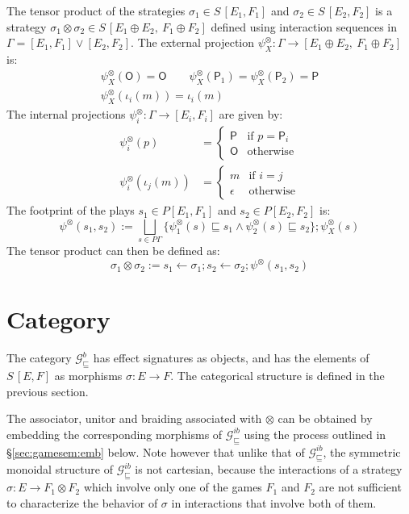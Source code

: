 \documentclass[11pt,oneside,draft]{book}
\theoremstyle{definition}
\newcommand{\gcat}{\mathcal{G}_{\sqsubseteq}}
\newcommand{\kw}[1]{\ensuremath{ \mathsf{#1} }}
\begin{document}
The tensor product of the strategies
$\sigma_1 \in S\,[E_1,F_1]$ and
$\sigma_2 \in S\,[E_2,F_2]$
is a strategy
$\sigma_1 \otimes \sigma_2 \in S\,[E_1 \oplus E_2, \: F_1 \oplus F_2]$
defined using interaction sequences in
$\Gamma = [E_1,F_1] \vee [E_2,F_2]$.
The external projection
$\psi^\otimes_X : \Gamma \rightarrow [E_1 \oplus E_2, \: F_1 \oplus F_2]$
is:
\begin{gather*}
  \psi^\otimes_X(\kw{O}) = \kw{O} \qquad
  \psi^\otimes_X(\kw{P}_1) = \psi^\otimes_X(\kw{P}_2) = \kw{P} \\
  \psi^\otimes_X(\iota_i(m)) = \iota_i(m)
\end{gather*}
The internal projections
$\psi^\otimes_i : \Gamma \rightarrow [E_i, F_i]$
are given by:
\begin{align*}
  \psi^\otimes_i(p) &= \begin{cases}
    \kw{P} & \text{if } p = \kw{P}_i \\
    \kw{O} & \text{otherwise}
  \end{cases} \\
  \psi^\otimes_i(\iota_j(m)) &= \begin{cases}
    m & \text{if } i = j \\
    \epsilon & \text{otherwise}
  \end{cases}
\end{align*}
The footprint of the plays
$s_1 \in P [E_1,F_1]$ and $s_2 \in P [E_2, F_2]$
is:
\[
  \psi^\otimes(s_1, s_2) :=
  \bigsqcup_{s \in P \Gamma}
  \{ \psi^\otimes_1(s) \sqsubseteq s_1 \wedge
     \psi^\otimes_2(s) \sqsubseteq s_2 \} ;
  \psi^\otimes_X(s)
\]
The tensor product can then be defined as:
\[
  \sigma_1 \otimes \sigma_2 :=
  s_1 \leftarrow \sigma_1 ;
  s_2 \leftarrow \sigma_2 ;
  \psi^\otimes(s_1, s_2)
\]



\section{Category} \label{sec:gamesem:cat} %

The category $\gcat^b$
has effect signatures as objects,
and has the elements of $S \, [E,F]$
as morphisms $\sigma : E \rightarrow F$.
The categorical structure is
defined in the previous section.

The associator, unitor and braiding
associated with $\otimes$
can be obtained by embedding
the corresponding morphisms of $\gcat^{ib}$
using the process outlined in \S\ref{sec:gamesem:emb} below.
Note however that unlike that of $\gcat^{ib}$,
the symmetric monoidal structure of $\gcat^{ib}$
is not cartesian,
because the interactions of a strategy
$\sigma : E \rightarrow F_1 \otimes F_2$
which involve only one of the games $F_1$ and $F_2$
are not sufficient to characterize the behavior of $\sigma$
in interactions that involve both of them.
\end{document}
